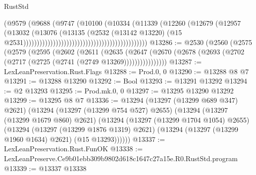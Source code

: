 \begin{lexlean}{RustStd}
\begin{coremodule}
                                                                    (@9579
                                                                      (@9688
                                                                        (@9747
                                                                          (@10100
                                                                            (@10334
                                                                              (@11339
                                                                                (@12260
                                                                                  (@12679
                                                                                    (@12957
                                                                                      (@13032
                                                                                        (@13076
                                                                                          (@13135
                                                                                            (@2532
                                                                                              (@13142
                                                                                                @13220)
                                                                                              (@15
                                                                                                @2531))))))))))))))))))))))))))))))))))))))))))))))
@13286 := @2530
    (@2560
      (@2575
        (@2579
          (@2595
            (@2602
              (@2611
                (@2635
                  (@2647
                    (@2670 (@2678 (@2693 (@2702 (@2717 (@2725 (@2741 (@2749 @13269))))))))))))))))
@13287 := LexLeanPreservation.Rust.Flags
@13288 := Prod.{0, 0}
@13290 := @13288 @8 @7
@13291 := @13288 @13290
@13292 := Bool
@13293 := @13291 @13292
@13294 := @2 @13293
@13295 := Prod.mk.{0, 0}
@13297 := @13295 @13290 @13292
@13299 := @13295 @8 @7
@13336 := @13294
    (@13297 (@13299 @689 @347) @2621)
    (@13294
      (@13297 (@13299 @754 @527) @2655)
      (@13294
        (@13297 (@13299 @1679 @860) @2621)
        (@13294
          (@13297 (@13299 @1704 @1054) @2655)
          (@13294
            (@13297 (@13299 @1876 @1319) @2621)
            (@13294 (@13297 (@13299 @1960 @1634) @2621) (@15 @13293))))))
@13337 := LexLeanPreservation.Rust.FunOK
@13338 := LexLeanPreserve.Ce9b01ebb309b9802d618c1647c27a15e.R0.RustStd.program
@13339 := @13337 @13338

\end{coremodule}
\end{lexlean}
